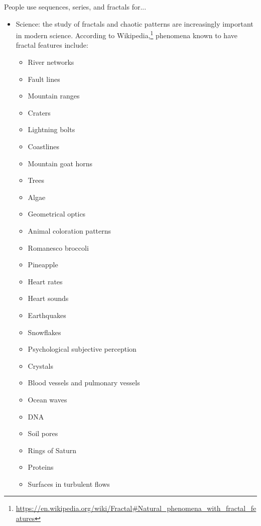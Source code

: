 \begin{center}
\begin{tcolorbox}[width=0.8\textwidth,colback={white},title={\textbf{What's it good for?}},colbacktitle=MidnightBlue,coltitle=white]
  People use sequences, series, and fractals for...
  \begin{itemize}
    \item Science: the study of fractals and chaotic patterns are increasingly important in modern science. According to
          Wikipedia,\footnote{\url{https://en.wikipedia.org/wiki/Fractal\#Natural_phenomena_with_fractal_features}}
          phenomena known to have fractal features include:
      \begin{multicols}{2}
      \begin{itemize}
        \item River networks
        \item Fault lines
        \item Mountain ranges
        \item Craters
        \item Lightning bolts
        \item Coastlines
        \item Mountain goat horns
        \item Trees
        \item Algae
        \item Geometrical optics
        \item Animal coloration patterns
        \item Romanesco broccoli
        \item Pineapple
        \item Heart rates
        \item Heart sounds
        \item Earthquakes
        \item Snowflakes
        \item Psychological subjective perception
        \item Crystals
        \item Blood vessels and pulmonary vessels
        \item Ocean waves
        \item DNA
        \item Soil pores
        \item Rings of Saturn
        \item Proteins
        \item Surfaces in turbulent flows

\end{itemize}
\end{multicols}
\end{itemize}
\end{tcolorbox}
\end{center}
